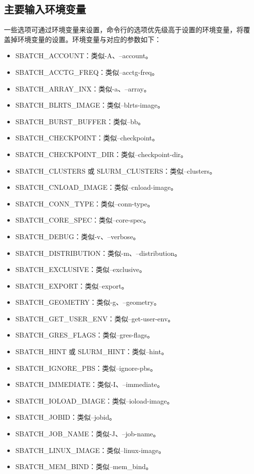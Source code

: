 \subsection{主要输入环境变量}
一些选项可通过环境变量来设置，命令行的选项优先级高于设置的环境变量，将覆盖掉环境变量的设置。环境变量与对应的参数如下：
\begin{itemize}
	\item SBATCH\_ACCOUNT：类似-A、--account。
	\item SBATCH\_ACCTG\_FREQ：类似--acctg-freq。
	\item SBATCH\_ARRAY\_INX：类似-a、--array。
	\item SBATCH\_BLRTS\_IMAGE：类似--blrts-image。
	\item SBATCH\_BURST\_BUFFER：类似--bb。
	\item SBATCH\_CHECKPOINT：类似--checkpoint。
	\item SBATCH\_CHECKPOINT\_DIR：类似--checkpoint-dir。
	\item SBATCH\_CLUSTERS 或 SLURM\_CLUSTERS：类似--clusters。
	\item SBATCH\_CNLOAD\_IMAGE：类似--cnload-image。
	\item SBATCH\_CONN\_TYPE：类似--conn-type。
	\item SBATCH\_CORE\_SPEC：类似--core-spec。
	\item SBATCH\_DEBUG：类似-v、--verbose。
	\item SBATCH\_DISTRIBUTION：类似-m、--distribution。
	\item SBATCH\_EXCLUSIVE：类似--exclusive。
	\item SBATCH\_EXPORT：类似--export。
	\item SBATCH\_GEOMETRY：类似-g、--geometry。
	\item SBATCH\_GET\_USER\_ENV：类似--get-user-env。
	\item SBATCH\_GRES\_FLAGS：类似--gres-flags。
	\item SBATCH\_HINT 或 SLURM\_HINT：类似--hint。
	\item SBATCH\_IGNORE\_PBS：类似--ignore-pbs。
	\item SBATCH\_IMMEDIATE：类似-I、--immediate。
	\item SBATCH\_IOLOAD\_IMAGE：类似--ioload-image。
	\item SBATCH\_JOBID：类似--jobid。
	\item SBATCH\_JOB\_NAME：类似-J、--job-name。
	\item SBATCH\_LINUX\_IMAGE：类似--linux-image。
	\item SBATCH\_MEM\_BIND：类似--mem\_bind。

\end{itemize}
